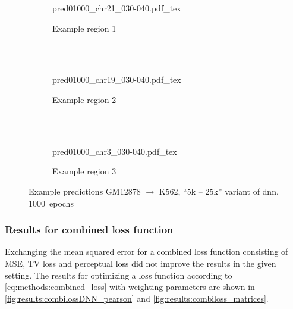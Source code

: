 \begin{figure}[p]
    \begin{subfigure}{\textwidth}
        \centering
        \scriptsize
        {pred01000_chr21_030-040.pdf_tex}
        \caption{Example  region 1} \label{fig:results:25k5_r1}
    \end{subfigure}\\[2mm]
    \\[3mm]
    \begin{subfigure}{\textwidth}
        \centering
        \scriptsize
        {pred01000_chr19_030-040.pdf_tex}
        \caption{Example region 2} \label{fig:results:25k5_r2}
    \end{subfigure}\\[2mm]
    \\[3mm]
    \begin{subfigure}{\textwidth}
        \centering
        \scriptsize
        {pred01000_chr3_030-040.pdf_tex}
        \caption{Example region 3} \label{fig:results:25k5_r3}
    \end{subfigure}
    \caption{Example predictions GM12878 $\rightarrow$ K562, ``5k -- 25k'' variant of \acrshort{dnn}, 1000~epochs} \label{fig:results:25k5_matrices}
\end{figure}

\subsubsection{Results for combined loss function} \label{sec:results:loss_functions}
Exchanging the mean squared error for a combined loss function consisting of MSE, TV loss and perceptual loss did not improve the results in the given setting.
The results for optimizing a loss function according to \cref{eq:methods:combined_loss} with weighting parameters 
are shown in \cref{fig:results:combilossDNN_pearson} and \ref{fig:results:combiloss_matrices}.


